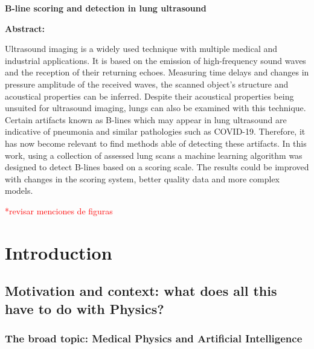 \documentclass[11pt]{article} %
\begin{document}
{\bfseries \large B-line scoring and detection in lung ultrasound }\vspace{10mm} 

{\bfseries \large Abstract: }\vspace{5mm} 

Ultrasound imaging is a widely used technique with multiple medical and industrial applications. It is based on the emission of high-frequency sound waves and the reception of their returning echoes. Measuring time delays and changes in pressure amplitude of the received waves, the scanned object's structure and acoustical properties can be inferred. Despite their acoustical properties being unsuited for ultrasound imaging, lungs can also be examined with this technique. Certain artifacts known as B-lines which may appear in lung ultrasound are indicative of pneumonia and similar pathologies such as COVID-19. Therefore, it has now become relevant to find methods able of detecting these artifacts. In this work, using a collection of assessed lung scans a machine learning algorithm was designed to detect B-lines based on a scoring scale. The results could be improved with changes in the scoring system, better quality data and more complex models.
 
\vspace{1cm}

\newpage



\tableofcontents
\newpage


\normalsize
\textcolor{red}{*revisar menciones de figuras}
\section{Introduction}

\subsection{Motivation and context: what does all this have to do with Physics?}

\subsubsection{The broad topic: Medical Physics and Artificial Intelligence}
	
\end{document}
